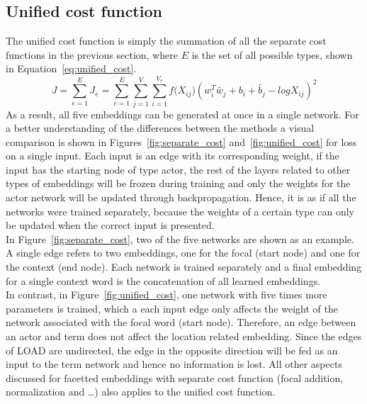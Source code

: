 \subsection{Unified cost function  }
\label{sec:unified_cost}
The unified cost function is simply the summation of all the separate cost functions in the previous section, where $E$ is the set of all possible types, shown in Equation~\ref{eq:unified_cost}.
\begin{equation}
J=\sum _{ e=1 }^{ E }{J_e}=\sum _{ e=1 }^{ E }{}\sum _{ j=1 }^{ V }{}\sum _{ i=1 }^{ V_e }{ f({ X }_{ ij } } )(w_{ i }^{ T }\tilde{  w_{ j } } +b_{ i }+\tilde{  b_{ j } } -log{ X }_{ ij })^2
\label{eq:unified_cost}
\end{equation}
As a result, all five embeddings can be generated at once in a single network. For a better understanding of the differences between the methods a visual comparison is shown in Figures~\ref{fig:separate_cost} and~\ref{fig:unified_cost} for loss on a single input. Each input is an edge with its corresponding weight, if the input has the starting node of type actor, the rest of the layers related to other types of embeddings will be frozen during training and only the weights for the actor network will be updated through backpropagation. Hence, it is as if all the networks were trained separately, because the weights of a certain type can only be updated when the correct input is presented.  \\
In Figure~\ref{fig:separate_cost}, two of the five networks are shown as an example. A single edge refers to two embeddings, one for the focal (start node) and one for the context (end node). Each network is trained separately and a final embedding for a single context word is the concatenation of all learned embeddings. \\
In contrast, in Figure~\ref{fig:unified_cost}, one network with five times more parameters is trained, which a each input edge only affects the weight of the network associated with the focal word (start node). Therefore, an edge between an actor and term does not affect the location related embedding. Since the edges of LOAD are undirected, the edge in the opposite direction will be fed as an input to the term network and hence no information is lost. All other aspects discussed for facetted embeddings with separate cost function (focal addition, normalization and \dots) also applies to the unified cost function. 

